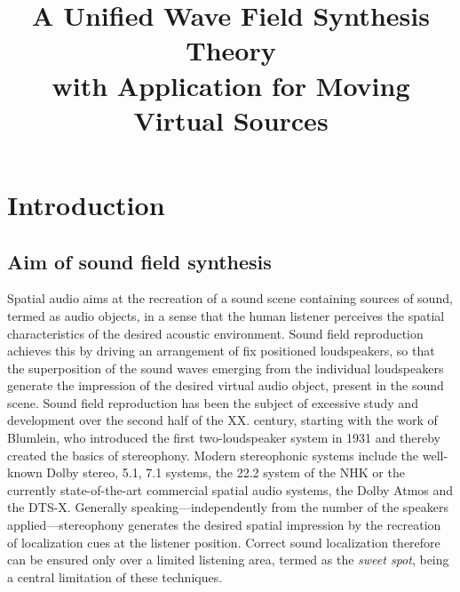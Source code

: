 \documentclass[10pt,twoside]{article}
\author{\theauthor}
\title{A Unified Wave Field Synthesis Theory\\[.5ex]with Application for Moving Virtual Sources}
\theoremstyle{thesisgroupstyle}
\theoremstyle{indented}
\begin{document}
\newcommand{\schoolname}{Budapest University of Technology and Economics}
\newcommand{\facultyname}{Faculty of Electrical Engineering and Informatics}
\newcommand{\doctoralname}{Doctoral School of Electrical Engineering}
\newcommand{\bookname}{Ph.D.\ Thesis Booklet}
\newcommand{\authorname}{Author}
\newcommand{\supervisorname}{Supervisor}
\newcommand{\supervisor}{Péter Fiala, PhD.}
\newcommand{\creationdate}{Budapest, 2018.}
\def \deptlogo {logos/hit_logo_en.png}

\nonfrenchspacing


\thispagestyle{empty}
\cleardoublepage
\setcounter{page}{1}

\section{Introduction}

\subsection{Aim of sound field synthesis}
%
Spatial audio aims at the recreation of a sound scene containing sources of sound, termed as audio objects, in a sense that the human listener perceives the spatial characteristics of the desired acoustic environment.
Sound field reproduction achieves this by driving an arrangement of fix positioned loudspeakers, so that the superposition of the sound waves emerging from the individual loudspeakers generate the impression of the desired virtual audio object, present in the sound scene.
Sound field reproduction has been the subject of excessive study and development over the second half of the XX. century, starting with the work of Blumlein, who introduced the first two-loudspeaker system in 1931 and thereby created the basics of stereophony.
Modern stereophonic systems include the well-known Dolby stereo, 5.1, 7.1 systems, the 22.2 system of the NHK or the currently state-of-the-art commercial spatial audio systems, the Dolby Atmos and the DTS-X.
Generally speaking---independently from the number of the speakers applied---stereophony generates the desired spatial impression by the recreation of localization cues at the listener position.
Correct sound localization therefore can be ensured only over a limited listening area, termed as the \emph{sweet spot}, being a central limitation of these techniques.
\end{document}
